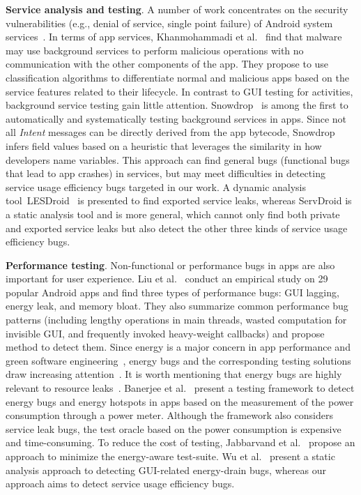 \documentclass[conference]{IEEEtran}
\begin{document}
\textbf{Service analysis and testing}. A number of work concentrates on the
security vulnerabilities (e.g., denial of service, single point failure) of
Android system services~\cite{ReavesBGABCDHKS16,HuangZ0015,WangZL16,FengS16,AbualolaAKOM16,LuoZCCLLGYXL17}.
In terms of app services, Khanmohammadi et al.~\cite{KhRH15} find that malware
may use background services to perform malicious operations with no communication with
the other components of the app.
They propose to use classification algorithms to differentiate normal and
malicious apps based on the service features related to their lifecycle. In
contrast to GUI testing for activities, background service testing gain little
attention. \textsf{Snowdrop}~\cite{ZhangLLC17} is among the first to
automatically and systematically testing background services in apps. Since not
all \textit{Intent} messages can be directly derived from the app bytecode,
\textsf{Snowdrop} infers field values based on a heuristic that leverages the
similarity in how developers name variables. This approach can find general bugs
(functional bugs that lead to app crashes) in services, but may meet
difficulties in detecting service usage efficiency bugs targeted in our work.
A dynamic analysis tool~\textsf{LESDroid}~\cite{ma2018} is presented to find
exported service leaks, whereas \textsf{ServDroid} is a static analysis tool and
is more general, which cannot only find both private and exported service leaks
but also detect the other three kinds of service usage efficiency bugs.

\textbf{Performance testing}. Non-functional or performance bugs in apps are
also important for user experience. Liu et al.~\cite{LiuXC14} conduct an
empirical study on 29 popular Android apps and find three types of performance
bugs: GUI lagging, energy leak, and memory bloat. They also summarize common
performance bug patterns (including lengthy operations in main threads, wasted
computation for invisible GUI, and frequently invoked heavy-weight callbacks)
and propose method to detect them. Since energy is a major concern in app
performance and green software
engineering~\cite{PangHAH16,HoqueSKXT16,MBZSJSPC16,0036990}, energy bugs and the
corresponding testing solutions draw increasing attention~\cite{GuoZYZZ13,BanerjeeC0R14,LiuXCL14,BehrouzSBM16,WuYR16,JabbarvandM17}.
It is worth mentioning that energy bugs are highly relevant to resource
leaks~\cite{GuoZYZZ13,BanerjeeC0R14,LiuXCL14,WuYR16}. Banerjee et
al.~\cite{BanerjeeC0R14} present a testing framework to detect energy bugs and
energy hotspots in apps based on the measurement of the power consumption through a power meter.
Although the framework also considers service leak bugs, the test oracle based
on the power consumption is expensive and time-consuming.
To reduce the cost of testing, Jabbarvand et al.~\cite{BehrouzSBM16} propose an
approach to minimize the energy-aware test-suite. Wu et
al.~\cite{WuYR16} present a static analysis approach to detecting GUI-related energy-drain
bugs, whereas our approach aims to detect service usage efficiency bugs.
\end{document}
